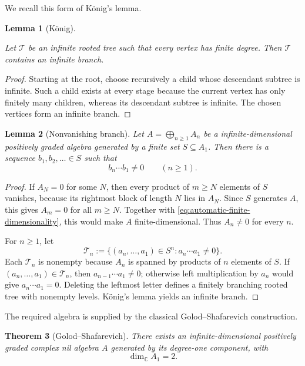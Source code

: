 \documentclass[11pt]{article}
\newtheorem{theorem}{Theorem}[section]
\newtheorem{lemma}[theorem]{Lemma}
\theoremstyle{remark}
\begin{document}
We recall this form of K\"onig's lemma.

\begin{lemma}[K\"onig]
\label{Konig}
  
Let $\mathcal{T}$ be an infinite rooted tree such that every vertex has finite degree.
Then $\mathcal{T}$ contains an infinite branch.

\end{lemma}

\begin{proof}

Starting at the root, choose recursively a child whose descendant subtree is
infinite.  Such a child exists at every stage because the current vertex has
only finitely many children, whereas its descendant subtree is infinite.  The
chosen vertices form an infinite branch.

\end{proof}




\begin{lemma}[Nonvanishing branch]
\label{lem:branch}
Let $A=\bigoplus_{n\geq1}A_n$ be a infinite-dimensional positively graded
algebra generated by a finite set $S\subseteq A_1$.  Then there is a sequence
$b_1,b_2,\ldots\in S$ such that
\[
  b_n\cdots b_1\neq0
  \qquad(n\geq1).
\]
\end{lemma}

\begin{proof}
If $A_N=0$ for some $N$, then every product of $m\geq N$ elements of $S$
vanishes, because its rightmost block of length $N$ lies in $A_N$.  Since $S$
generates $A$, this gives $A_m=0$ for all $m\geq N$.  Together with
\eqref{eq:automatic-finite-dimensionality}, this would make $A$
finite-dimensional.  Thus $A_n\neq0$ for every $n$.

For $n\geq1$, let
\[
  \mathcal T_n
  :=\{(a_n,\ldots,a_1)\in S^n:a_n\cdots a_1\neq0\}.
\]
Each $\mathcal T_n$ is nonempty because $A_n$ is spanned by products of $n$
elements of $S$.  If $(a_n,\ldots,a_1)\in\mathcal T_n$, then
$a_{n-1}\cdots a_1\neq0$; otherwise left multiplication by $a_n$ would give
$a_n\cdots a_1=0$.  Deleting the leftmost letter defines a finitely branching
rooted tree with nonempty levels.  K\"onig's lemma yields an infinite branch.
\end{proof}

The required algebra is supplied by the classical Golod--Shafarevich
construction.

\begin{theorem}[Golod--Shafarevich]
\label{thm:golod}
There exists an infinite-dimensional positively graded complex nil algebra
$A$ generated by its degree-one component, with
\[
  \dim_{\mathbb C}A_1=2.
\]
\end{theorem}
\end{document}
